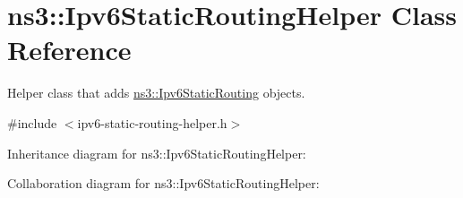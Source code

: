 \hypertarget{classns3_1_1Ipv6StaticRoutingHelper}{}\section{ns3\+:\+:Ipv6\+Static\+Routing\+Helper Class Reference}
\label{classns3_1_1Ipv6StaticRoutingHelper}


Helper class that adds \hyperlink{classns3_1_1Ipv6StaticRouting}{ns3\+::\+Ipv6\+Static\+Routing} objects.  




{\ttfamily \#include $<$ipv6-\/static-\/routing-\/helper.\+h$>$}



Inheritance diagram for ns3\+:\+:Ipv6\+Static\+Routing\+Helper\+:


Collaboration diagram for ns3\+:\+:Ipv6\+Static\+Routing\+Helper\+:
